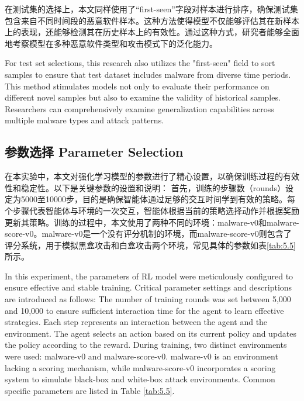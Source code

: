 在测试集的选择上，本文同样使用了“first-seen”字段对样本进行排序，确保测试集包含来自不同时间段的恶意软件样本。这种方法使得模型不仅能够评估其在新样本上的表现，还能够检测其在历史样本上的有效性。通过这种方式，研究者能够全面地考察模型在多种恶意软件类型和攻击模式下的泛化能力。

For test set selections, this research also utilizes the "first-seen" field to sort samples to ensure that test dataset includes malware from diverse time periods. This method stimulates models not only to evaluate their performance on different novel samples but also to examine the validity of historical samples. Researchers can comprehensively examine generalization capabilities across multiple malware types and attack patterns.

\subsection{参数选择 Parameter Selection}

在本实验中，本文对强化学习模型的参数进行了精心设置，以确保训练过程的有效性和稳定性。以下是关键参数的设置和说明：
首先，训练的步骤数（rounds）设定为5000至10000步，目的是确保智能体通过足够的交互时间学到有效的策略。每个步骤代表智能体与环境的一次交互，智能体根据当前的策略选择动作并根据奖励更新其策略。训练的过程中，本文使用了两种不同的环境：malware-v0和malware-score-v0。malware-v0是一个没有评分机制的环境，而malware-score-v0则包含了评分系统，用于模拟黑盒攻击和白盒攻击两个环境，常见具体的参数如表\ref{tab:5.5}所示。

In this experiment, the parameters of RL model were meticulously configured to ensure effective and stable training. Critical parameter settings and descriptions are introduced as follows: The number of training rounds was set between 5,000 and 10,000 to ensure sufficient interaction time for the agent to learn effective strategies. Each step represents an interaction between the agent and the environment. The agent selects an action based on its current policy and updates the policy according to the reward. During training, two distinct environments were used: malware-v0 and malware-score-v0. malware-v0 is an environment lacking a scoring mechanism, while malware-score-v0 incorporates a scoring system to simulate black-box and white-box attack environments. Common specific parameters are listed in Table \ref{tab:5.5}.

